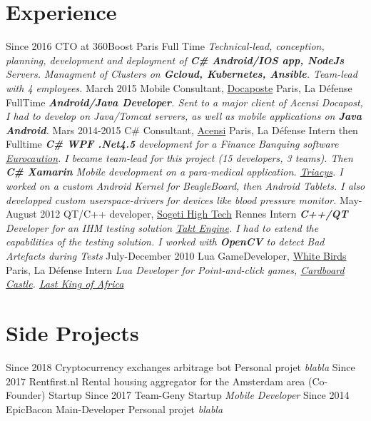 \documentclass{emonides-cv}
\begin{document}
\section{Experience}
\begin{entrylist}
  \entry
    {Since  2016}
    {CTO at 360Boost {\normalfont Paris}}
    {Full Time}
    {\emph{Technical-lead, conception, planning, development and deployment of \textbf{C\# Android/IOS app, NodeJs} Servers.
     Managment of Clusters on \textbf{Gcloud, Kubernetes, Ansible}. Team-lead with 4 employees.}}
  \entry
    {March 2015}
    {Mobile Consultant, \href{https://www.docapost.com/en/}{Docaposte} {\normalfont Paris, La Défense}}
    {FullTime}
    {\emph{\textbf{Android/Java Developer}. Sent to a major client of Acensi Docapost, I had to develop on Java/Tomcat servers, as well as mobile applications on \textbf{Java Android}.}}
  \entry
    {Mars 2014-2015}
    {C\# Consultant, \href{https://www.acensi.fr/}{Acensi} {\normalfont Paris, La Défense}}
    {Intern then Fulltime}
    {\emph{\textbf{C\# WPF .Net4.5} development for a Finance Banquing software \href{https://www.eurocaution.net/}{Eurocaution}.
    I became team-lead for this project (15 developers, 3 teams).
    Then \textbf{C\# Xamarin} Mobile development on a para-medical application. \href{http://www.triacys.com/}{Triacys}.
    I worked on a custom Android Kernel for BeagleBoard, then Android Tablets. I also developped custom userspace-drivers for devices like blood pressure monitor.}}
  \entry
    {May-August 2012}
    {QT/C++ developer, \href{https://www.acensi.fr/}{Sogeti High Tech} {\normalfont Rennes}}
    {Intern}
    {\emph{\textbf{C++/QT} Developer for an IHM testing solution \href{https://www.eurocaution.net/}{Takt Engine}.
    I had to extend the capabilities of the testing solution. I worked with \textbf{OpenCV} to detect Bad Artefacts during Tests }}
  \entry
    {July-December 2010}
    {Lua GameDeveloper, \href{https://www.giantbomb.com/white-birds-productions/3010-5637/}{White Birds} {\normalfont Paris, La Défense}}
    {Intern}
    {\emph{Lua Developer for Point-and-click games, \href{https://www.bigfishgames.com/games/6859/cardboard-castle/}{Cardboard Castle}. \href{https://www.wikiwand.com/fr/White_Birds_Productions}{Last King of Africa}}}
\end{entrylist}

\section{Side Projects}
\begin{entrylist}
  \entry
    {Since  2018}
    {Cryptocurrency exchanges arbitrage bot {\normalfont }}
    {Personal projet}
    {\emph{blabla}}
  \entry
    {Since  2017}
    {Rentfirst.nl {\normalfont Rental housing aggregator for the Amsterdam area (Co-Founder)}}
    {Startup}
    {\emph{}}
  \entry
    {Since  2017}
    {Team-Geny {\normalfont }}
    {Startup}
    {\emph{Mobile Developer}}
  \entry
    {Since  2014}
    {EpicBacon {\normalfont Main-Developer}}
    {Personal projet}
    {\emph{blabla}}
  
\end{entrylist}
\end{document}
